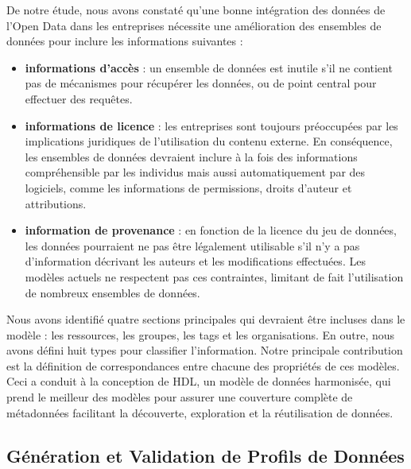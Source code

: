 De notre \'{e}tude, nous avons constat\'{e} qu'une bonne int\'{e}gration des donn\'{e}es de l'Open Data dans les entreprises n\'{e}cessite une am\'{e}lioration des ensembles de donn\'{e}es pour inclure les informations suivantes :
\begin{itemize}
	\item\textbf{informations d'acc\`{e}s} : un ensemble de donn\'{e}es est inutile s'il ne contient pas de m\'{e}canismes pour r\'{e}cup\'{e}rer les donn\'{e}es, ou de point central pour effectuer des requêtes.
	\item\textbf{informations de licence} : les entreprises sont toujours pr\'{e}occup\'{e}es par les implications juridiques de l'utilisation du contenu externe. En cons\'{e}quence, les ensembles de donn\'{e}es devraient inclure à la fois des informations compr\'{e}hensible par les individus mais aussi automatiquement par des logiciels, comme les informations de permissions, droits d'auteur et attributions.
	\item\textbf{information de provenance} : en fonction de la licence du jeu de donn\'{e}es, les donn\'{e}es pourraient ne pas être l\'{e}galement utilisable s'il n'y a pas d'information d\'{e}crivant les auteurs et les modifications effectu\'{e}es. Les mod\`{e}les actuels ne respectent pas ces contraintes, limitant de fait l'utilisation de nombreux ensembles de donn\'{e}es.
\end{itemize}

Nous avons identifi\'{e} quatre sections principales qui devraient être incluses dans le mod\`{e}le : les ressources, les groupes, les tags et les organisations. En outre, nous avons d\'{e}fini huit types pour classifier l'information. Notre principale contribution est la d\'{e}finition de correspondances entre chacune des propri\'{e}t\'{e}s de ces mod\`{e}les. Ceci a conduit à la conception de HDL, un mod\`{e}le de donn\'{e}es harmonis\'{e}e, qui prend le meilleur des mod\`{e}les pour assurer une couverture compl\`{e}te de m\'{e}tadonn\'{e}es facilitant la d\'{e}couverte, exploration et la r\'{e}utilisation de donn\'{e}es.

\subsection{G\'{e}n\'{e}ration et Validation de Profils de Donn\'{e}es}

